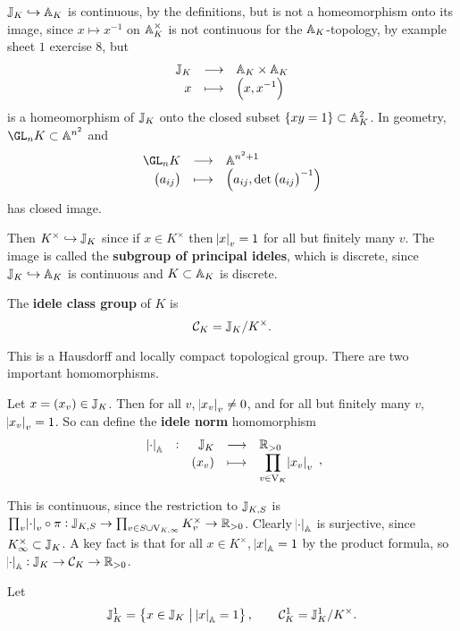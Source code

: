 \begin{remark*}
$ \JJ_K \hookrightarrow \AA_K $ is continuous, by the definitions, but is not a homeomorphism onto its image, since $ x \mapsto x^{-1} $ on $ \AA_K^\times $ is not continuous for the $ \AA_K $-topology, by example sheet $ 1 $ exercise $ 8 $, but
$$ \function{\JJ_K}{\AA_K \times \AA_K}{x}{\br{x, x^{-1}}} $$
is a homeomorphism of $ \JJ_K $ onto the closed subset $ \cbr{xy = 1} \subset \AA_K^2 $. In geometry, $ \GL_n K \subset \AA^{n^2} $ and
$$ \function{\GL_n K}{\AA^{n^2 + 1}}{\br{a_{ij}}}{\br{a_{ij}, \det \br{a_{ij}}^{-1}}} $$
has closed image.
\end{remark*}

Then $ K^\times \hookrightarrow \JJ_K $ since if $ x \in K^\times $ then $ \abs{x}_v = 1 $ for all but finitely many $ v $. The image is called the \textbf{subgroup of principal ideles}, which is discrete, since $ \JJ_K \hookrightarrow \AA_K $ is continuous and $ K \subset \AA_K $ is discrete.

\pagebreak


\begin{definition*}
The \textbf{idele class group} of $ K $ is
$$ \CCC_K = \JJ_K / K^\times. $$
\end{definition*}

This is a Hausdorff and locally compact topological group. There are two important homomorphisms.

\begin{definition*}
Let $ x = \br{x_v} \in \JJ_K $. Then for all $ v $, $ \abs{x_v}_v \ne 0 $, and for all but finitely many $ v $, $ \abs{x_v}_v = 1 $. So can define the \textbf{idele norm} homomorphism
$$ \function[\abs{\cdot}_\AA]{\JJ_K}{\RR_{> 0}}{\br{x_v}}{\prod_{v \in \V_K} \abs{x_v}_v}, $$
\end{definition*}

This is continuous, since the restriction to $ \JJ_{K, S} $ is $ \prod_v \abs{\cdot}_v \circ \pi : \JJ_{K, S} \to \prod_{v \in S \cup \V_{K, \infty}} K_v^\times \to \RR_{> 0} $. Clearly $ \abs{\cdot}_\AA $ is surjective, since $ K_\infty^\times \subset \JJ_K $. A key fact is that for all $ x \in K^\times $, $ \abs{x}_\AA = 1 $ by the product formula, so $ \abs{\cdot}_\AA : \JJ_K \to \CCC_K \to \RR_{> 0} $.

\begin{definition*}
Let
$$ \JJ_K^1 = \cbr{x \in \JJ_K \st \abs{x}_\AA = 1}, \qquad \CCC_K^1 = \JJ_K^1 / K^\times. $$
\end{definition*}

